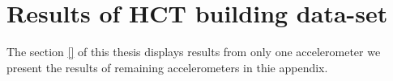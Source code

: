 \chapter{Results of HCT building data-set}\label{appModalHCT}
The section \ref{} of this thesis displays results from only one accelerometer we present the results of remaining accelerometers in thie appendix.

